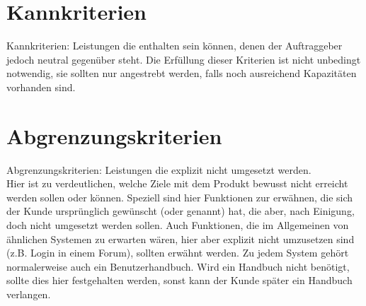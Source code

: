 
\section{Kannkriterien}\label{sec:kannkriterien}

Kannkriterien: Leistungen die enthalten sein können, denen der Auftraggeber jedoch neutral gegenüber steht.
Die Erfüllung dieser Kriterien ist nicht unbedingt notwendig, sie sollten nur angestrebt werden, 
falls noch ausreichend Kapazitäten vorhanden sind.


\section{Abgrenzungskriterien}\label{sec:abgrenzungskriterien}
Abgrenzungskriterien: Leistungen die explizit nicht umgesetzt werden.\\
Hier ist zu verdeutlichen, welche Ziele mit dem Produkt bewusst nicht erreicht werden sollen oder können. 
Speziell sind hier Funktionen zur erwähnen, die sich der Kunde ursprünglich gewünscht (oder genannt) hat, die aber, nach Einigung, 
doch nicht umgesetzt werden sollen. Auch Funktionen, die im Allgemeinen von ähnlichen Systemen zu erwarten wären,
hier aber explizit nicht umzusetzen sind (z.B. Login in einem Forum), sollten erwähnt werden. 
Zu jedem System gehört normalerweise auch ein Benutzerhandbuch. Wird ein Handbuch nicht benötigt, 
sollte dies hier festgehalten werden, sonst kann der Kunde später ein Handbuch verlangen.

